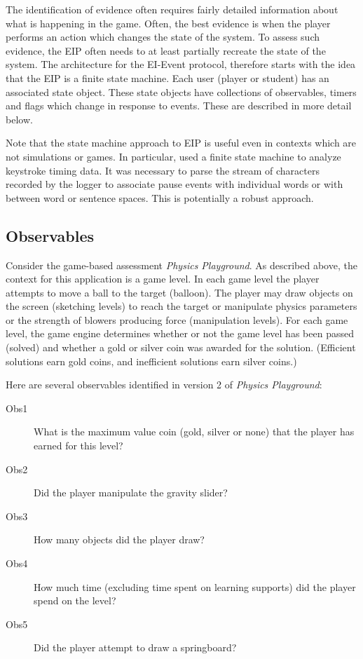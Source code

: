 \documentclass{article}
\begin{document}
  The identification of evidence often requires fairly detailed
  information about what is happening in the game.  Often, the best
  evidence is when the player performs an action which changes the
  state of the system.  To assess such evidence, the EIP often needs
  to at least partially recreate the state of the system. The
  architecture for the EI-Event protocol, therefore starts
  with the idea that the EIP is a finite state machine.  Each user
  (player or student) has an associated state object.  These state
  objects have collections of observables, timers and flags which
  change in response to events.  These are described in more detail
  below.

  Note that the state machine approach to EIP is useful even in
  contexts which are not simulations or games.  In particular,
   used a finite state machine to analyze keystroke
  timing data.  It was necessary to parse the stream of characters
  recorded by the logger to associate pause events with individual
  words or with between word or sentence spaces.  This is potentially
  a robust approach.

  \subsection{Observables}
  \label{sub:obs}

  Consider the game-based assessment \textit{Physics Playground}.  As
  described above, the context for this application is a game level.
  In each game level the player attempts to move a ball to the target
  (balloon).  The player may draw objects on the screen (sketching
  levels) to reach the target or manipulate physics parameters or the
  strength of blowers producing force (manipulation levels).  For each
  game level, the game engine determines whether or not the game level
  has been passed (solved) and whether a gold or silver coin was
  awarded for the solution.  (Efficient solutions earn gold coins, and
  inefficient solutions earn silver coins.)

  Here are several observables identified in version 2 of
  \textit{Physics Playground}:
  \begin{description}
    \item[Obs1]{What is the maximum value coin (gold, silver or none)
      that the player has earned for this level?}
    \item[Obs2]{Did the player manipulate the gravity slider?}
    \item[Obs3]{How many objects did the player draw?}
    \item[Obs4]{How much time (excluding time spent on learning
      supports) did the player spend on the level?}
    \item[Obs5]{Did the player attempt to draw a springboard?}
  \end{description}
\end{document}
